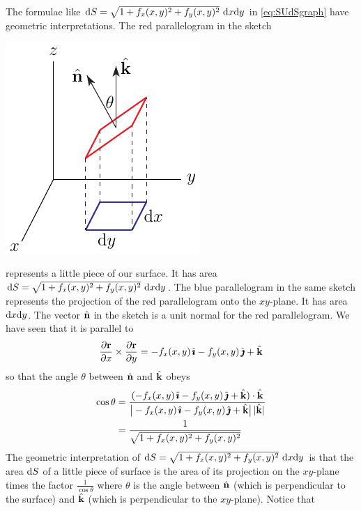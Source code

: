 The formulae like 
$\dee{S}= \sqrt{1 + f_x(x,y)^2 + f_y(x,y)^2}\ \dee{x}\dee{y}$
in \eqref{eq:SUdSgraph} have geometric interpretations. The red
parallelogram in the sketch
\begin{nfig}
\begin{center}
    \includegraphics{surfaceProj.pdf}
\end{center}
\end{nfig}
represents a little piece of our surface. It has area
$\dee{S}= \sqrt{1 + f_x(x,y)^2 + f_y(x,y)^2}\ \dee{x}\dee{y}$.
The blue parallelogram in the same sketch represents the projection
of the red parallelogram onto the $xy$-plane. It has area $\mathrm{d}x\mathrm{d}y$.
The vector $\hat{\mathbf{n}}$ in the sketch is a unit normal for the red parallelogram.
We have seen that it is parallel to 
\begin{equation*}
\frac{\partial\mathbf{r}}{\partial x}\times
              \frac{\partial\mathbf{r}}{\partial y}
= -f_x(x,y)\,\hat{\pmb{\imath}} - f_y(x,y)\,\hat{\pmb{\jmath}} + \hat{\mathbf{k}}
\end{equation*}
so that the angle $\theta$ between $\hat{\mathbf{n}}$ and $\hat{\mathbf{k}}$ obeys
\begin{align*}
\cos\theta &= \frac{(-f_x(x,y)\,\hat{\pmb{\imath}} - f_y(x,y)\,\hat{\pmb{\jmath}} + \hat{\mathbf{k}})\cdot\hat{\mathbf{k}}}
                 {\big|-f_x(x,y)\,\hat{\pmb{\imath}} - f_y(x,y)\,\hat{\pmb{\jmath}} + \hat{\mathbf{k}}\big|\,|\hat{\mathbf{k}}|} \\
&=\frac{1}{\sqrt{1 + f_x(x,y)^2 + f_y(x,y)^2}}
\end{align*}
The geometric interpretation of 
$\dee{S}= \sqrt{1 + f_x(x,y)^2 + f_y(x,y)^2}\ \dee{x}\dee{y}$
is that the area $\mathrm{d}S$ of a little piece of surface is the
area of its projection on the $xy$-plane times the factor
$\frac{1}{\cos\theta}$ where $\theta$ is the angle between $\hat{\mathbf{n}}$
(which is perpendicular to the surface) and $\hat{\mathbf{k}}$ (which is
perpendicular to the $xy$-plane). Notice that

